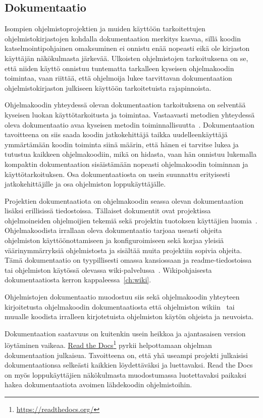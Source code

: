 \documentclass[finnish]{tktltiki2}
\theoremstyle{definition}
\theoremstyle{remark}
\begin{document}
\subsection{Dokumentaatio}

Isompien ohjelmistoprojektien ja muiden käyttöön tarkoitettujen ohjelmistokirjastojen kohdalla dokumentaation merkitys kasvaa, sillä koodin katselmointipohjainen omaksuminen ei onnistu enää nopeasti eikä ole kirjaston käyttäjän näkökulmasta järkevää. Ulkoisten ohjelmistojen tarkoituksena on se, että niiden käyttö onnistuu tuntematta tarkalleen kyseisen ohjelmakoodin toimintaa, vaan riittää, että ohjelmoija lukee tarvittavan dokumentaation ohjelmistokirjaston julkiseen käyttöön tarkoitetuista rajapinnoista.

Ohjelmakoodin yhteydessä olevan dokumentaation tarkoituksena on selventää kyseisen luokan käyttötarkoitusta ja toimintaa. Vastaavasti metodien yhteydessä oleva dokumentaatio avaa kyseisen metodin toiminnallisuutta~\cite{javadoc}.
Dokumentaation tavoitteena on siis saada koodin jatkokehittäjä taikka uudelleenkäyttäjä ymmärtämään koodin toiminta siinä määrin, että hänen ei tarvitse lukea ja tutustua kaikkeen ohjelmakoodiin, mikä on hidasta, vaan hän onnistuu lukemalla kompaktin dokumentaation sisäistämään nopeasti ohjelmakoodin toiminnan ja käyttötarkoituksen.
Osa dokumentaatiosta on usein suunnattu erityisesti jatkokehittäjille ja osa ohjelmiston loppukäyttäjälle.

Projektien dokumentaatiota on ohjelmakoodin seassa olevan dokumentaation lisäksi erillisissä tiedostoissa. Tällaiset dokumentit ovat projektissa ohjelmoineiden ohjelmoijien tekemiä sekä projektin tuotoksen käyttäjien luomia~\cite{using-wikis-in-sw}.
Ohjelmakoodista irrallaan oleva dokumentaatio tarjoaa useasti ohjeita ohjelmiston käyttöönottamiseen ja konfiguroimiseen sekä korjaa yleisiä väärinymmärryksiä ohjelmistosta ja sisältää muita projektiin sopivia ohjeita. Tämä dokumentaatio on tyypillisesti omassa kansiossaan ja readme-tiedostoissa tai ohjelmiston käytössä olevassa wiki-palvelussa~\cite{using-wikis-in-sw}. Wikipohjaisesta dokumentaatiosta kerron kappaleessa~\ref{ch:wiki}.

Ohjelmistojen dokumentaatio muodostuu siis sekä ohjelmakoodin yhteyteen kirjoitetusta ohjelmakoodin dokumentaatiosta että ohjelmiston wikiin~\cite{using-wikis-in-sw} tai muualle koodista irralleen kirjotetuista ohjelmiston käytön ohjeista ja neuvoista.

Dokumentaation saatavuus on kuitenkin usein heikkoa ja ajantasaisen version löytäminen vaikeaa. \href{https://readthedocs.org/}{Read the Docs}\footnote{\url{https://readthedocs.org/}} pyrkii helpottamaan ohjelman dokumentaation julkaisua. Tavoitteena on, että yhä useampi projekti julkaisisi dokumentaationsa selkeästi kaikkien löydettäväksi ja luettavaksi. Read the Docs on myös loppukäyttäjien näkökulmasta muodostumassa luotettavaksi paikaksi hakea dokumentaatiota avoimen lähdekoodin ohjelmistoihin.
\end{document}
